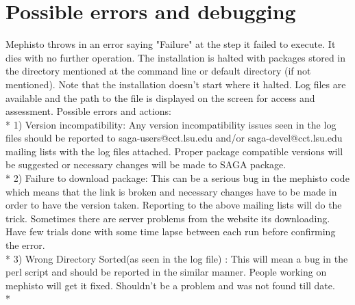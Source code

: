\documentclass[a4paper,10pt]{article}
\begin{document}
\section*{Possible errors and debugging} 
Mephisto throws in an error saying "Failure" at the step it failed to execute. 
It dies with no further operation. The installation is halted with packages stored 
in the directory mentioned at the command line or default directory (if not mentioned).
Note that the installation doesn't start where it halted. Log files are available and the
path to the file is displayed on the screen for access and assessment. 
Possible errors and actions: \\*
1) Version incompatibility: Any version incompatibility issues seen in the 
log files should be reported to saga-users@cct.lsu.edu and/or 
saga-devel@cct.lsu.edu mailing lists with the log files attached. 
Proper package compatible versions will be suggested or necessary changes 
will be made to SAGA package.\\*
2) Failure to download package: This can be a serious bug in the mephisto code which means 
that the link is broken and necessary changes have to be made in order to have the version
taken. Reporting to the above mailing lists will do the trick. Sometimes there are server
problems from the website its downloading. Have few trials done with some time
lapse between each run before confirming the error. \\*
3) Wrong Directory Sorted(as seen in the log file) : This will mean a bug in the perl script 
and should be reported in the similar manner. People working on mephisto will get it fixed. 
Shouldn't be a problem and was not found till date. \\*

 
  
 
\end{document}
